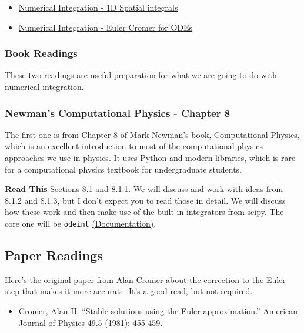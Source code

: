 \begin{itemize}
\tightlist
\item
  \href{../../assets/notes/Notes-Numerical_Integration_1D_Spatial.pdf}{Numerical
  Integration - 1D Spatial integrals}
\item
  \href{../../assets/notes/Notes-Numerical_Integration_Euler_Cromer.pdf}{Numerical
  Integration - Euler Cromer for ODEs}
\end{itemize}

\subsubsection{Book Readings}\label{book-readings}

These two readings are useful preparation for what we are going to do
with numerical integration.

\subsubsection{Newman's Computational Physics - Chapter
8}\label{newmans-computational-physics---chapter-8}

The first one is from
\href{https://github.com/dannycab/phy415msu/blob/main/MMIPbook/assets/pdfs/scans/Newman_Ch8_ODEs.pdf}{Chapter
8 of Mark Newman's book, Computational Physics}, which is an excellent
introduction to most of the computational physics approaches we use in
physics. It uses Python and modern libraries, which is rare for a
computational physics textbook for undergraduate students.

\textbf{Read This} Sections 8.1 and 8.1.1. We will discuss and work with
ideas from 8.1.2 and 8.1.3, but I don't expect you to read those in
detail. We will discuss how these work and then make use of the
\href{https://docs.scipy.org/doc/scipy/tutorial/integrate.html}{built-in
integrators from scipy}. The core one will be \texttt{odeint}
\href{https://docs.scipy.org/doc/scipy/reference/generated/scipy.integrate.odeint.html}{(Documentation)}.

\subsection{Paper Readings}\label{paper-readings}

Here's the original paper from Alan Cromer about the correction to the
Euler step that makes it more accurate. It's a good read, but not
required.

\begin{itemize}
\tightlist
\item
  \href{https://github.com/dannycab/phy415fall23/blob/main/content/assets/papers/euler_cromer_1981.pdf}{Cromer,
  Alan H. ``Stable solutions using the Euler approximation.'' American
  Journal of Physics 49.5 (1981): 455-459.}
\end{itemize}
